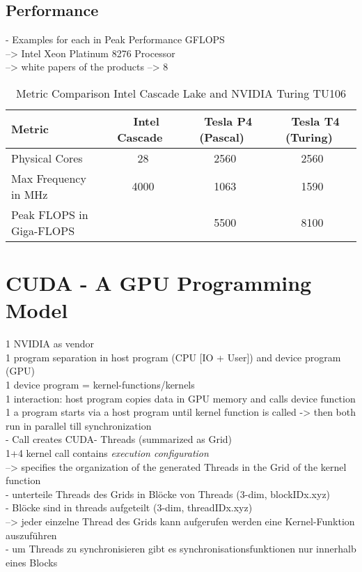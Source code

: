 \documentclass[a4paper,12pt]{llncs}
\numberwithin{equation}{section}
\begin{document}
\subsection{Performance}
  - Examples for each in Peak Performance GFLOPS\\
    --> Intel Xeon Platinum 8276 Processor \\
    --> white papers of the products --> 8
\begin{table}[htbp]
  \centering
  \caption{Metric Comparison Intel Cascade Lake and NVIDIA Turing TU106}
  \label{tab:comp}
  \begin{tabular}{|l|c|c|c|}
    \hline
	\textbf{Metric} & \textbf{~Intel Cascade~} & \textbf{~Tesla P4 (Pascal)~} & \textbf{~Tesla T4 (Turing)~} \\\hline
	Physical Cores & 28 & 2560 & 2560 \\\hline
	Max Frequency in MHz & 4000 & 1063 & 1590 \\\hline
	Peak FLOPS in Giga-FLOPS & & 5500 & 8100 \\\hline
  \end{tabular}
\end{table}


\section{CUDA - A GPU Programming Model}
      1 NVIDIA as vendor\\
      1 program separation in host program (CPU [IO + User]) and device program (GPU)\\
      1 device program = kernel-functions/kernels\\
	  1 interaction: host program copies data in GPU memory and calls device function\\
	  1 a program starts via a host program until kernel function is called -> then both run in parallel till synchronization\\
		- Call creates CUDA- Threads (summarized as Grid)\\
	  1+4 kernel call contains \textit{execution configuration}\\
	    --> specifies the organization of the generated Threads in the Grid of the kernel function\\
	  	  - unterteile Threads des Grids in Blöcke von Threads (3-dim, blockIDx.xyz)\\
	  	  - Blöcke sind in threads aufgeteilt (3-dim, threadIDx.xyz)\\
	   --> jeder einzelne Thread des Grids kann aufgerufen werden eine Kernel-Funktion auszuführen\\
          - um Threads zu synchronisieren gibt es synchronisationsfunktionen nur innerhalb eines Blocks\\
          
\end{document}
